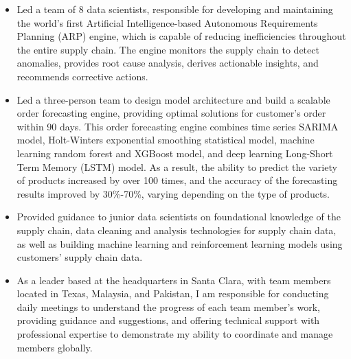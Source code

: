 \documentclass[margin, 10pt]{res} %
\begin{document}
\begin{resume}
\begin{itemize}
    \item Led a team of 8 data scientists, responsible for developing and maintaining the world's first Artificial Intelligence-based Autonomous Requirements Planning (ARP) engine, which is capable of reducing inefficiencies throughout the entire supply chain. The engine monitors the supply chain to detect anomalies, provides root cause analysis, derives actionable insights, and recommends corrective actions.
    \item Led a three-person team to design model architecture and build a scalable order forecasting engine, providing optimal solutions for customer's order within 90 days. This order forecasting engine combines time series SARIMA model, Holt-Winters exponential smoothing statistical model, machine learning random forest and XGBoost model, and deep learning Long-Short Term Memory (LSTM) model. As a result, the ability to predict the variety of products increased by over 100 times, and the accuracy of the forecasting results improved by 30\%-70\%, varying depending on the type of products.
    \item Provided guidance to junior data scientists on foundational knowledge of the supply chain, data cleaning and analysis technologies for supply chain data, as well as building machine learning and reinforcement learning models using customers' supply chain data.
    \item As a leader based at the headquarters in Santa Clara, with team members located in Texas, Malaysia, and Pakistan, I am responsible for conducting daily meetings to understand the progress of each team member's work, providing guidance and suggestions, and offering technical support with professional expertise to demonstrate my ability to coordinate and manage members globally.
\end{itemize}



\end{resume}
\end{document}
